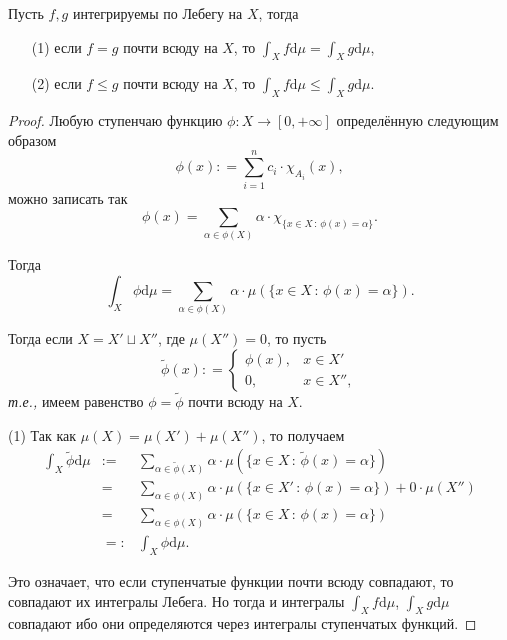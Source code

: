 \begin{lemma}
    Пусть $f,g$ интегрируемы по Лебегу на $X$, тогда
    \begin{itemize}
        \item[(1)] если $f =g$ почти всюду на $X$, то $\int_Xf \mathrm{d}\mu = \int_X g\mathrm{d}\mu$,
        \item [(2)] если $f \le g$ почти всюду на $X$, то $\int_Xf \mathrm{d}\mu \le \int_X g\mathrm{d}\mu$.
    \end{itemize}
\end{lemma}

\begin{proof}
Любую ступенчаю функцию $\phi:X \to [0,+\infty]$ определённую следующим образом
    \[
     \phi(x) : = \sum_{i=1}^n c_i \cdot \chi_{A_i}(x),
    \]
    можно записать так
    \[
     \phi(x) = \sum_{\alpha \in \phi(X)} \alpha\cdot \chi_{\{ x \in X\, :\, \phi(x) = \alpha \}}.
    \]

    Тогда
    \[
     \int_X \phi \mathrm{d}\mu = \sum_{\alpha \in \phi(X)} \alpha\cdot \mu(\{ x \in X\, :\, \phi(x) = \alpha \}).
    \]

    Тогда если $X = X'\sqcup X''$, где $\mu(X'') = 0$, то пусть 
    \[
     \widetilde{\phi}(x): = \begin{cases}
         \phi(x), & x \in X'\\
         0, & x \in X'',
     \end{cases}
    \]
    \textit{т.е.,} имеем равенство $\phi = \widetilde{\phi}$ почти всюду на $X$. 
    
(1) Так как $\mu(X) = \mu(X') + \mu(X'')$, то получаем
\begin{eqnarray*}
 \int_X \widetilde{\phi} \mathrm{d}\mu &:=& \sum_{\alpha \in \widetilde{\phi}(X)} \alpha\cdot \mu(\{ x \in X\, :\, \widetilde{\phi}(x) = \alpha \}) \\
 &=& \sum_{\alpha \in \phi(X)} \alpha\cdot \mu(\{ x \in X'\, :\, \phi(x) = \alpha \}) + 0\cdot \mu(X'')\\
 &=&\sum_{\alpha \in \phi(X)} \alpha\cdot \mu(\{ x \in X\, :\, \phi(x) = \alpha \})\\
 &=:& \int_X \phi \mathrm{d}\mu.
\end{eqnarray*}
    
Это означает, что если ступенчатые функции почти всюду совпадают, то совпадают их интегралы Лебега. Но тогда и интегралы $\int_X f \mathrm{d}\mu$, $\int_X g \mathrm{d}\mu$ совпадают ибо они определяются через интегралы ступенчатых функций.


\end{proof}

